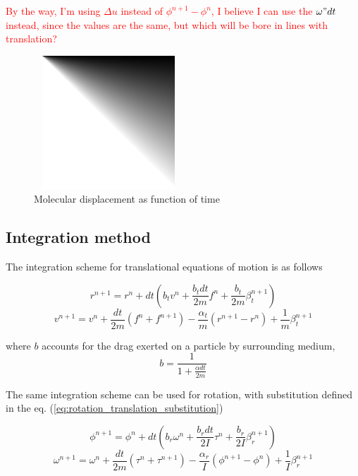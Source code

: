 \textcolor{red}{By the way, I'm using $\Delta u$ instead of $\phi^{n+1} - \phi^{n}$, I believe I can use the $\omega" dt$ instead, since the values are the same, but which will be bore in lines with translation?}

\begin{figure}[h]
	\centering
	\includegraphics[width=0.5\textwidth, height=5cm]{Images/dummy.png}
	\caption{Molecular displacement as function of time}
	\label{fig:displacement_vs_time}
\end{figure}

\subsection{Integration method}
\label{subsec:integration_method}

The integration scheme for translational equations of motion is as follows

\begin{equation}
\label{eq:tr_coordinate_change}
	r^{n+1} = r^n + dt \left(
	 b_{t} v^n
	 + \frac{b_{t} dt}{2m}f^n
	 + \frac{b_{t}}{2m}\beta_{t}^{n+1}
	\right)
\end{equation}
\begin{equation}
\label{eq:tr_velocity_change}
	v^{n+1} = v^n 
	 + \frac{dt}{2m}\left(f^n + f^{n+1}\right)
	 - \frac{\alpha_{t}}{m}\left(r^{n+1} - r^n\right)
	 + \frac{1}{m}\beta_{t}^{n+1}
\end{equation}

where $b$ accounts for the drag exerted on a particle by surrounding medium,
\begin{equation}
\label{eq:drag_coefficient}
	b = \frac{1}{1 + \frac{\alpha dt}{2 m}}
\end{equation}

The same integration scheme can be used for rotation, with substitution defined in the eq. (\ref{eq:rotation_translation_substitution})
	
\begin{equation}
\label{eq:rot_angle_change}
	\phi^{n+1} = \phi^n + dt \left(
	  b_{r} \omega^n
	  + \frac{b_{r} dt}{2I}\tau^n
	  + \frac{b_{r} }{2I}\beta_{r}^{n+1}
	 \right)
\end{equation}
\begin{equation}
\label{eq:rot_ang_velocity_change}
	\omega^{n+1} = \omega^n
	+ \frac{dt}{2m}\left(\tau^n + \tau^{n+1}\right)
	- \frac{\alpha_{r}}{I}\left(\phi^{n+1} - \phi^n\right)
	+ \frac{1}{I}\beta_{r}^{n+1}
\end{equation}

